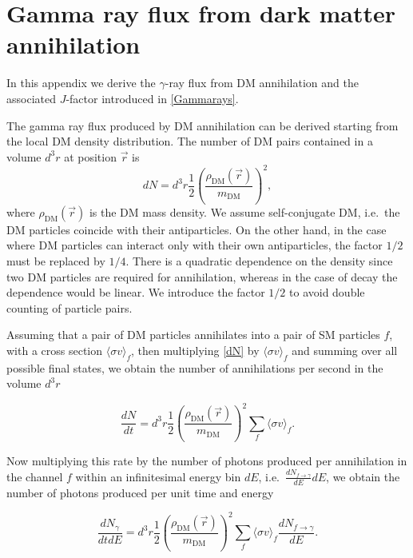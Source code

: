 \appendix


\chapter{Gamma ray flux from dark matter annihilation} \label{app:gammaflux}

In this appendix we derive the $\gamma$-ray flux from DM annihilation and the
associated $J$-factor introduced in \cref{Gammarays}.

The gamma ray flux produced by DM annihilation can be derived starting from the local DM density distribution.
The number of DM pairs contained in a volume $d^3r$ at position $\vec{r}$ is
\begin{equation} \label{dN}
    dN = d^3r \frac{1}{2} \left( \frac{\rho_{\mathrm{DM}}(\vec{r})}{m_{\mathrm{DM}}} \right)^2,
\end{equation}
where $\rho_{\mathrm{DM}}(\vec{r})$ is the DM mass density. We assume self-conjugate DM, i.e.\ the DM particles coincide with their antiparticles. On the other hand, in the case where DM particles can interact only with their own antiparticles, the factor $1/2$ must be replaced by $1/4$.
There is a quadratic dependence on the density since two DM particles are required for annihilation, whereas in the case of decay the dependence would be linear.
We introduce the factor $1/2$ to avoid double counting of particle pairs.

Assuming that a pair of DM particles annihilates into a pair of SM particles $f$, with a cross section $\langle \sigma v \rangle_f$, then multiplying \cref{dN} by $\langle \sigma v \rangle_f$ and summing over all possible final states, we obtain the number of annihilations per second in the volume $d^3r$

\begin{equation}
   \frac{dN}{dt} = d^3r \frac{1}{2} \left( \frac{\rho_{\mathrm{DM}}(\vec{r})}{m_{\mathrm{DM}}} \right)^2 \sum_f \langle \sigma v \rangle_f.
\end{equation}

Now multiplying this rate by the number of photons produced per annihilation in the channel $f$ within an infinitesimal energy bin $dE$, i.e.\ $\frac{dN_{f\to\gamma}}{dE}dE$, we obtain the number of photons produced per unit time and energy

\begin{equation}
   \frac{dN_{\gamma}}{dtdE} = d^3r \frac{1}{2} \left( \frac{\rho_{\mathrm{DM}}(\vec{r})}{m_{\mathrm{DM}}} \right)^2 \sum_f \langle \sigma v \rangle_f \frac{dN_{f\to\gamma}}{dE}. 
\end{equation}

